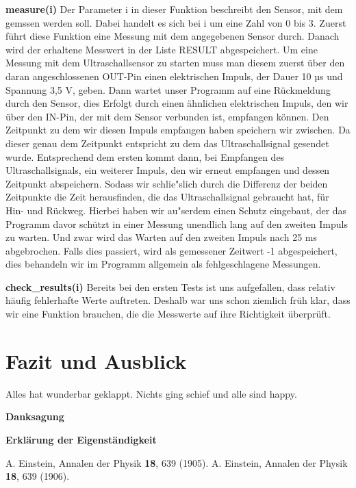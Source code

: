 \documentclass[a4paper,12pt]{article}
\begin{document}
\textbf{measure(i)}
\newline
Der Parameter i in dieser Funktion beschreibt den Sensor, mit dem gemssen werden soll. Dabei handelt es sich bei i um
eine Zahl von 0 bis 3. Zuerst f\"uhrt diese Funktion eine Messung mit dem angegebenen Sensor durch. Danach wird der
erhaltene Messwert in der Liste RESULT abgespeichert. Um eine Messung mit dem Ultraschallsensor zu starten muss man
diesem zuerst \"uber den daran angeschlossenen OUT-Pin einen elektrischen Impuls, der Dauer 10 µs und Spannung 3,5 V, 
geben. Dann wartet unser Programm auf eine R\"uckmeldung durch den Sensor, dies Erfolgt durch einen \"ahnlichen
elektrischen Impuls, den wir \"uber den IN-Pin, der mit dem Sensor verbunden ist, empfangen k\"onnen. Den Zeitpunkt zu
dem wir diesen Impuls empfangen haben speichern wir zwischen. Da dieser genau dem Zeitpunkt entspricht zu dem das
Ultraschallsignal gesendet wurde. Entsprechend dem ersten kommt dann, bei Empfangen des Ultraschallsignals, ein weiterer
Impuls, den wir erneut empfangen und dessen Zeitpunkt abspeichern. Sodass wir schlie"slich durch die Differenz der
beiden Zeitpunkte die Zeit herausfinden, die das Ultraschallsignal gebraucht hat, f\"ur Hin- und R\"uckweg. Hierbei
haben wir au"serdem einen Schutz eingebaut, der das Programm davor sch\"utzt in einer Messung unendlich lang auf den
zweiten Impuls zu warten. Und zwar wird das Warten auf den zweiten Impuls nach 25 ms abgebrochen. Falls dies passiert,
wird als gemessener Zeitwert -1 abgespeichert, dies behandeln wir im Programm allgemein als fehlgeschlagene Messungen.

\medskip

\textbf{check\_results(i)}
\newline
Bereits bei den ersten Tests ist uns aufgefallen, dass relativ h\"aufig fehlerhafte Werte auftreten. Deshalb war uns
schon ziemlich fr\"uh klar, dass wir eine Funktion brauchen, die die Messwerte auf ihre Richtigkeit \"uberpr\"uft.

\section{Fazit und Ausblick}\label{sec3}

Alles hat wunderbar geklappt. Nichts ging schief und alle sind happy.


\bigskip


{\large\bf Danksagung}

\bigskip


{\large\bf Erkl\"arung der Eigenst\"andigkeit}

\bigskip


\begin{thebibliography}{99}
	\itemsep-2pt \small\frenchspacing
	A. Einstein, Annalen der Physik {\bf 18}, 639 (1905).
	\newline
	A. Einstein, Annalen der Physik {\bf 18}, 639 (1906).
\end{thebibliography}
\end{document}
